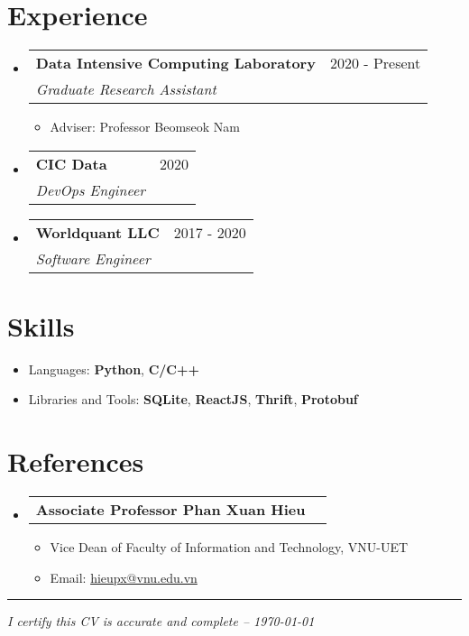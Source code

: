 \documentclass[a4paper,11pt]{article}
\makeatletter
\newcommand{\resumeItem}[1]{
  \item\small{
    {#1 \vspace{-2pt}}
  }
}
\newcommand{\resumeSubheadTwo}[2]{
  \vspace{-1pt}\item
    \begin{tabular*}{0.97\textwidth}{l@{\extracolsep{\fill}}r}
      \textbf{#1} & #2
    \end{tabular*}\vspace{-5pt}
}
\newcommand{\resumeSubhead}[3]{
  \vspace{-1pt}\item
    \begin{tabular*}{0.97\textwidth}{l@{\extracolsep{\fill}}r}
      \textbf{#1} & #2 \\
      \textit{\normalsize#3}
    \end{tabular*}\vspace{-5pt}
}
\newcommand{\resumeSubHeadingListStart}{\begin{itemize}[leftmargin=*]}
\newcommand{\resumeSubHeadingListEnd}{\end{itemize}}
\newcommand{\resumeItemListStart}{\begin{itemize}}
\newcommand{\resumeItemListEnd}{\end{itemize}\vspace{-5pt}}
\makeatother
\begin{document}
\section{Experience}
  \resumeSubHeadingListStart
    \resumeSubhead
      {Data Intensive Computing Laboratory}{2020 - Present}
      {Graduate Research Assistant}
      \resumeItemListStart
        \resumeItem{Adviser: Professor Beomseok Nam}
      \resumeItemListEnd
    \resumeSubhead
      {CIC Data}{2020}
      {DevOps Engineer}
    \resumeSubhead
      {Worldquant LLC}{2017 - 2020}
      {Software Engineer}
  \resumeSubHeadingListEnd

\section{Skills}
  \resumeItemListStart
    \resumeItem{Languages: \textbf{Python}, \textbf{C/C++}}
    \resumeItem{Libraries and Tools: \textbf{SQLite}, \textbf{ReactJS}, \textbf{Thrift}, \textbf{Protobuf}}
  \resumeItemListEnd

\section{References}
  \resumeSubHeadingListStart
    \resumeSubheadTwo
      {Associate Professor Phan Xuan Hieu}{}
      \resumeItemListStart
        \resumeItem{Vice Dean of Faculty of Information and Technology, VNU-UET}
        \resumeItem{Email: \href{mailto:hieupx@vnu.edu.vn}{hieupx@vnu.edu.vn}}
      \resumeItemListEnd
  \resumeSubHeadingListEnd

\noindent\rule{\textwidth}{1pt}
\emph{I certify this CV is accurate and complete – \today}
\end{document}
